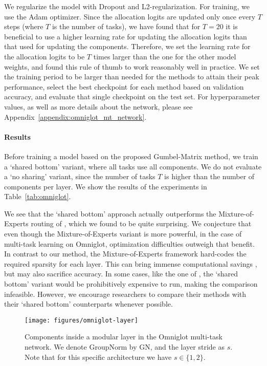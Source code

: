\documentclass[conference]{IEEEtran}
\begin{document}
We regularize the model with Dropout and L2-regularization. For training, we use the Adam optimizer. Since the allocation logits are updated only once every $T$ steps (where $T$ is the number of tasks), we have found that for $T = 20$ it is beneficial to use a higher learning rate for updating the allocation logits than that used for updating the components. Therefore, we set the learning rate for the allocation logits to be $T$ times larger than the one for the other model weights, and found this rule of thumb to work reasonably well in practice. We set the training period to be larger than needed for the methods to attain their peak performance, select the best checkpoint for each method based on validation accuracy, and evaluate that single checkpoint on the test set. For hyperparameter values, as well as more details about the network, please see Appendix~\ref{appendix:omniglot_mt_network}.

\paragraph{Results}

Before training a model based on the proposed Gumbel-Matrix method, we train a `shared bottom' variant, where all tasks use all components. We do not evaluate a `no sharing' variant, since the number of tasks $T$ is higher than the number of components per layer.
We show the results of the experiments in Table~\ref{tab:omniglot}.

We see that the `shared bottom' approach actually outperforms the Mixture-of-Experts routing of \cite{Diversity&Depth-ICLR-2019}, which we found to be quite surprising. We conjecture that even though the Mixture-of-Experts variant is more powerful, in the case of multi-task learning on Omniglot, optimization difficulties outweigh that benefit. In contrast to our method, the Mixture-of-Experts framework hard-codes the required sparsity for each layer. This can bring immense computational savings \cite{Shazeer-MoE-2017}, but may also sacrifice accuracy. In some cases, like the one of \cite{Shazeer-MoE-2017}, the `shared bottom' variant would be prohibitively expensive to run, making the comparison infeasible. However, we encourage researchers to compare their methods with their `shared bottom' counterparts whenever possible.

\begin{figure}[t]
\begin{center}
\texttt{[image: figures/omniglot-layer]}
\end{center}
\caption{Components inside a modular layer in the Omniglot multi-task network. We denote GroupNorm by GN, and the layer stride as $s$. Note that for this specific architecture we have $s \in \{1, 2\}$.}\label{fig:omniglot-layer}
\end{figure}
\end{document}
